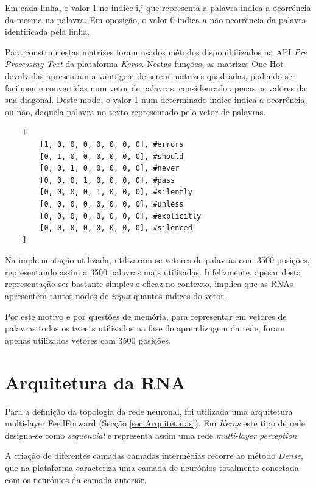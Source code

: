 Em cada linha, o valor 1 no indice i,j que representa a palavra indica a ocorrência da mesma na palavra. Em oposição, o valor 0 indica a não ocorrência da palavra identificada pela linha. 

Para construir estas matrizes foram usados métodos disponibilizados na API \textit{Pre Processing Text} da plataforma \textit{Keras}. Nestas funções, as matrizes One-Hot devolvidas apresentam a vantagem de serem matrizes quadradas, podendo ser facilmente convertidas num vetor de palavras, considenrado apenas os valores da sua diagonal. Deste modo, o valor 1 num determinado indice indica a ocorrência, ou não, daquela palavra no texto representado pelo vetor de palavras. 

\begin{verbatim}
    [
        [1, 0, 0, 0, 0, 0, 0, 0], #errors
        [0, 1, 0, 0, 0, 0, 0, 0], #should
        [0, 0, 1, 0, 0, 0, 0, 0], #never
        [0, 0, 0, 1, 0, 0, 0, 0], #pass
        [0, 0, 0, 0, 1, 0, 0, 0], #silently
        [0, 0, 0, 0, 0, 0, 0, 0], #unless
        [0, 0, 0, 0, 0, 0, 0, 0], #explicitly
        [0, 0, 0, 0, 0, 0, 0, 0], #silenced
    ]
\end{verbatim}

Na implementação utilizada, utilizaram-se vetores de palavras com 3500 posições, representando assim a 3500 palavras mais utilizadas. 
Infelizmente, apesar desta representação ser bastante simples e eficaz no contexto, implica que as RNAs apresentem tantos nodos de \textit{input} quantos índices do vetor. 

Por este motivo e por questões de memória, para representar em vetores de palavras todos os tweets utilizados na fase de aprendizagem da rede, foram apenas utilizados vetores com 3500 posições. 

\section{Arquitetura da RNA}

Para a definição da topologia da rede neuronal, foi utilizada uma arquitetura multi-layer FeedForward (Secção \ref{sec:Arquiteturas}). Em \textit{Keras} este tipo de rede designa-se como \textit{sequencial} e representa assim uma rede \textit{multi-layer perception}.

A criação de diferentes camadas camadas intermédias recorre ao método \textit{Dense}, que na plataforma caracteriza uma camada de neurónios totalmente conectada com os neurónios da camada anterior. 

